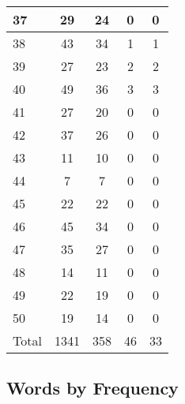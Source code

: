 \begin{center}
\begin{longtable}{l|c|c|c|c}
37 & 29 & 24 & 0 & 0\\ \hline
38 & 43 & 34 & 1 & 1\\ \hline
39 & 27 & 23 & 2 & 2\\ \hline
40 & 49 & 36 & 3 & 3\\ \hline
41 & 27 & 20 & 0 & 0\\ \hline
42 & 37 & 26 & 0 & 0\\ \hline
43 & 11 & 10 & 0 & 0\\ \hline
44 & 7 & 7 & 0 & 0\\ \hline
45 & 22 & 22 & 0 & 0\\ \hline
46 & 45 & 34 & 0 & 0\\ \hline
47 & 35 & 27 & 0 & 0\\ \hline
48 & 14 & 11 & 0 & 0\\ \hline
49 & 22 & 19 & 0 & 0\\ \hline
50 & 19 & 14 & 0 & 0\\ \hline
\hline \hline
Total & 1341 & 358 & 46 & 33



\end{longtable}
\end{center}

 
\subsection{Words by Frequency}

